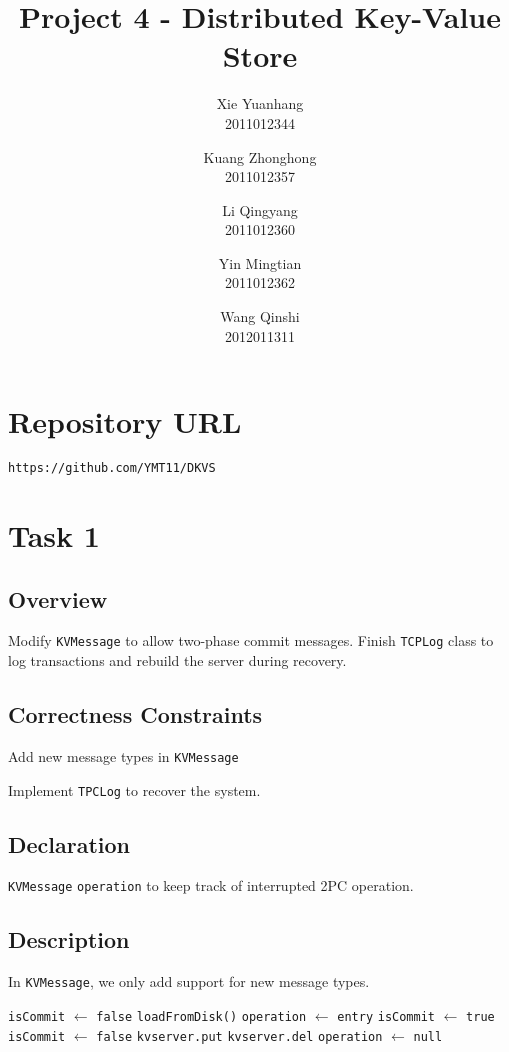 \documentclass{article}
\title{Project 4 - Distributed Key-Value Store}
\author{
Xie Yuanhang  \\   2011012344\and
Kuang Zhonghong  \\   2011012357\and
Li Qingyang   \\   2011012360 \and
Yin Mingtian   \\   2011012362\and
Wang Qinshi   \\   2012011311}
\date{}
\begin{document}
\maketitle

\setcounter{section}{-1}
 \section{Repository URL}
\texttt{https://github.com/YMT11/DKVS}

\section{Task 1}
\subsection{Overview}
Modify \texttt{KVMessage} to allow two-phase commit messages. Finish \texttt{TCPLog} class to log transactions 
and rebuild the server during recovery.
\subsection{Correctness Constraints}
\begin{compactitem}
	\item Add new message types in \texttt{KVMessage}
	\item Implement \texttt{TPCLog} to recover the system.
\end{compactitem}
\subsection{Declaration}
\texttt{KVMessage} \texttt{operation} to keep track of interrupted 2PC operation.
\subsection{Description}
In \texttt{KVMessage}, we only add support for new message types.
\begin{bframe}
	\begin{algorithmic}
			\State \texttt{isCommit} $\leftarrow$ \texttt{false}
			\State \texttt{loadFromDisk()}
					\State \texttt{operation} $\leftarrow$ \texttt{entry}
					\State \texttt{isCommit} $\leftarrow$ \texttt{true}
					\State \texttt{isCommit} $\leftarrow$ \texttt{false}
						\State \texttt{kvserver.put}
						\State \texttt{kvserver.del}
					\EndIf
					\State \texttt{operation} $\leftarrow$ \texttt{null}
				\EndIf
			\EndFor
		\EndProcedure
	\end{algorithmic}
\end{bframe}
\end{document}
